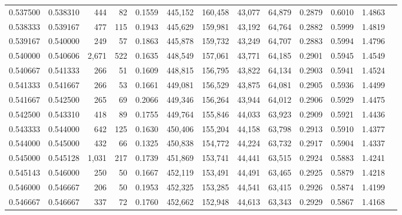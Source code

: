 \begin{tabular}{rrrrrrrrrrrrr}
0.537500 & 0.538310 &   444 &  82 &                                     0.1559 & 445,152 & 160,458 &  43,077 &  64,879 & 0.2879 & 0.6010 & 1.4863 \\
0.538333 & 0.539167 &   477 & 115 &                                     0.1943 & 445,629 & 159,981 &  43,192 &  64,764 & 0.2882 & 0.5999 & 1.4819 \\
0.539167 & 0.540000 &   249 &  57 &                                     0.1863 & 445,878 & 159,732 &  43,249 &  64,707 & 0.2883 & 0.5994 & 1.4796 \\
0.540000 & 0.540606 & 2,671 & 522 &                                     0.1635 & 448,549 & 157,061 &  43,771 &  64,185 & 0.2901 & 0.5945 & 1.4549 \\
0.540667 & 0.541333 &   266 &  51 &                                     0.1609 & 448,815 & 156,795 &  43,822 &  64,134 & 0.2903 & 0.5941 & 1.4524 \\
0.541333 & 0.541667 &   266 &  53 &                                     0.1661 & 449,081 & 156,529 &  43,875 &  64,081 & 0.2905 & 0.5936 & 1.4499 \\
0.541667 & 0.542500 &   265 &  69 &                                     0.2066 & 449,346 & 156,264 &  43,944 &  64,012 & 0.2906 & 0.5929 & 1.4475 \\
0.542500 & 0.543310 &   418 &  89 &                                     0.1755 & 449,764 & 155,846 &  44,033 &  63,923 & 0.2909 & 0.5921 & 1.4436 \\
0.543333 & 0.544000 &   642 & 125 &                                     0.1630 & 450,406 & 155,204 &  44,158 &  63,798 & 0.2913 & 0.5910 & 1.4377 \\
0.544000 & 0.545000 &   432 &  66 &                                     0.1325 & 450,838 & 154,772 &  44,224 &  63,732 & 0.2917 & 0.5904 & 1.4337 \\
0.545000 & 0.545128 & 1,031 & 217 &                                     0.1739 & 451,869 & 153,741 &  44,441 &  63,515 & 0.2924 & 0.5883 & 1.4241 \\
0.545143 & 0.546000 &   250 &  50 &                                     0.1667 & 452,119 & 153,491 &  44,491 &  63,465 & 0.2925 & 0.5879 & 1.4218 \\
0.546000 & 0.546667 &   206 &  50 &                                     0.1953 & 452,325 & 153,285 &  44,541 &  63,415 & 0.2926 & 0.5874 & 1.4199 \\
0.546667 & 0.546667 &   337 &  72 &                                     0.1760 & 452,662 & 152,948 &  44,613 &  63,343 & 0.2929 & 0.5867 & 1.4168 \\

\end{tabular}
